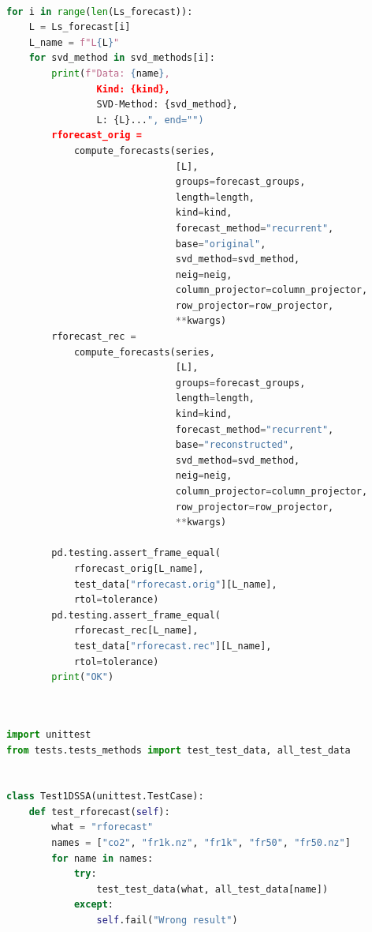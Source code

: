 \documentclass[specialist,
			   substylefile = spbu_report.rtx,
			   subf,href,colorlinks=true, 12pt]{disser}
\begin{document}
\begin{lstlisting}[language=Python, caption=Перебор параметров рекуррентного прогнозирования и проверка результатов на правильность.]
	
for i in range(len(Ls_forecast)):
    L = Ls_forecast[i]
    L_name = f"L{L}"
    for svd_method in svd_methods[i]:
        print(f"Data: {name},
                Kind: {kind}, 
                SVD-Method: {svd_method}, 
                L: {L}...", end="")
        rforecast_orig = 
            compute_forecasts(series,
                              [L], 
                              groups=forecast_groups,
                              length=length,
                              kind=kind,
                              forecast_method="recurrent", 
                              base="original",
                              svd_method=svd_method, 
                              neig=neig,
                              column_projector=column_projector, 
                              row_projector=row_projector,
                              **kwargs)
        rforecast_rec = 
            compute_forecasts(series,
                              [L], 
                              groups=forecast_groups, 
                              length=length,
                              kind=kind, 
                              forecast_method="recurrent",
                              base="reconstructed",
                              svd_method=svd_method, 
                              neig=neig,
                              column_projector=column_projector, 
                              row_projector=row_projector,
                              **kwargs)

        pd.testing.assert_frame_equal(
            rforecast_orig[L_name],
            test_data["rforecast.orig"][L_name],
            rtol=tolerance)
        pd.testing.assert_frame_equal(
            rforecast_rec[L_name], 
            test_data["rforecast.rec"][L_name],
            rtol=tolerance)
        print("OK")
	
\end{lstlisting}

\begin{lstlisting}[language=Python, caption=Запуск тестов правильности рекуррентного прогнозирования временного ряда и обработка исключений.]
	
import unittest
from tests.tests_methods import test_test_data, all_test_data


class Test1DSSA(unittest.TestCase):
    def test_rforecast(self):
        what = "rforecast"
        names = ["co2", "fr1k.nz", "fr1k", "fr50", "fr50.nz"]
        for name in names:
            try:
                test_test_data(what, all_test_data[name])
            except:
                self.fail("Wrong result")
	
\end{lstlisting}
\end{document}
